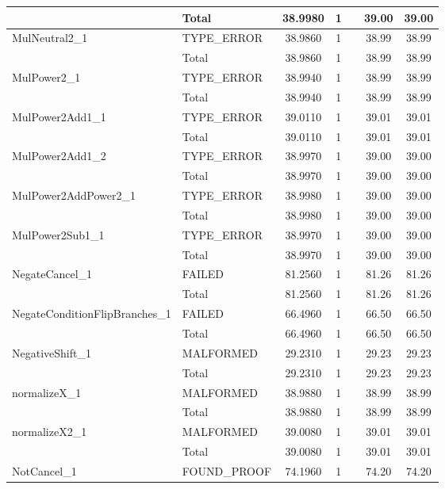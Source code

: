 \begin{appendices}
\begin{longtable}{L{0.25\textwidth} L{0.2\textwidth}  c  c  c  c  c }
    & Total & 38.9980 & 1 &  & 39.00 & 39.00 \\ \midrule 
    MulNeutral2\_1 & TYPE\_ERROR & 38.9860 & 1 &  & 38.99 & 38.99 \\ \midrule 
    & Total & 38.9860 & 1 &  & 38.99 & 38.99 \\ \midrule 
    MulPower2\_1 & TYPE\_ERROR & 38.9940 & 1 &  & 38.99 & 38.99 \\ \midrule 
    & Total & 38.9940 & 1 &  & 38.99 & 38.99 \\ \midrule 
    MulPower2Add1\_1 & TYPE\_ERROR & 39.0110 & 1 &  & 39.01 & 39.01 \\ \midrule 
    & Total & 39.0110 & 1 &  & 39.01 & 39.01 \\ \midrule 
    MulPower2Add1\_2 & TYPE\_ERROR & 38.9970 & 1 &  & 39.00 & 39.00 \\ \midrule 
    & Total & 38.9970 & 1 &  & 39.00 & 39.00 \\ \midrule 
    MulPower2AddPower2\_1 & TYPE\_ERROR & 38.9980 & 1 &  & 39.00 & 39.00 \\ \midrule 
    & Total & 38.9980 & 1 &  & 39.00 & 39.00 \\ \midrule 
    MulPower2Sub1\_1 & TYPE\_ERROR & 38.9970 & 1 &  & 39.00 & 39.00 \\ \midrule 
    & Total & 38.9970 & 1 &  & 39.00 & 39.00 \\ \midrule 
    NegateCancel\_1 & FAILED & 81.2560 & 1 &  & 81.26 & 81.26 \\ \midrule 
    & Total & 81.2560 & 1 &  & 81.26 & 81.26 \\ \midrule 
    NegateConditionFlipBranches\_1 & FAILED & 66.4960 & 1 &  & 66.50 & 66.50 \\ \midrule 
    & Total & 66.4960 & 1 &  & 66.50 & 66.50 \\ \midrule 
    NegativeShift\_1 & MALFORMED & 29.2310 & 1 &  & 29.23 & 29.23 \\ \midrule 
    & Total & 29.2310 & 1 &  & 29.23 & 29.23 \\ \midrule 
    normalizeX\_1 & MALFORMED & 38.9880 & 1 &  & 38.99 & 38.99 \\ \midrule 
    & Total & 38.9880 & 1 &  & 38.99 & 38.99 \\ \midrule 
    normalizeX2\_1 & MALFORMED & 39.0080 & 1 &  & 39.01 & 39.01 \\ \midrule 
    & Total & 39.0080 & 1 &  & 39.01 & 39.01 \\ \midrule 
    NotCancel\_1 & FOUND\_PROOF & 74.1960 & 1 &  & 74.20 & 74.20 \\ \midrule 

\end{longtable}
\end{appendices}
